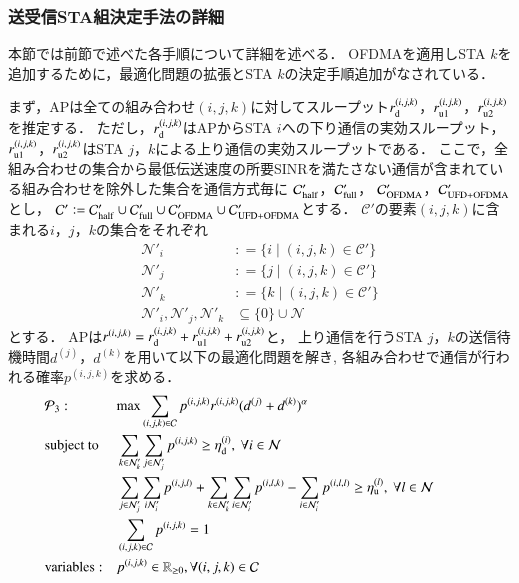 \documentclass[master]{kuisthesis}		%
\def\equiv{\mathrel{\mathop:}=}
\newcommand{\sijk}{(i,j,k)}
\newcommand{\rijk}{r^{(i,j,k)}}
\newcommand{\mthcd}{{\mathcal C}'}
\newcommand{\mthni}{{\mathcal N}'_i}
\newcommand{\mthnj}{{\mathcal N}'_j}
\newcommand{\mthnk}{{\mathcal N}'_k}
\begin{document}
		\subsubsection{送受信STA組決定手法の詳細}
			本節では前節で述べた各手順について詳細を述べる．
			OFDMAを適用しSTA $k$を追加するために，最適化問題の拡張とSTA $k$の決定手順追加がなされている．
			\par
			まず，APは全ての組み合わせ$(i,j,k)$に対してスループット$r^{(i,j,k)}_{\rm d}$，$r^{(i,j,k)}_{\rm u1}$，$r^{(i,j,k)}_{\rm u2}$を推定する．
			ただし，$r^{(i,j,k)}_{\rm d}$はAPからSTA $i$への下り通信の実効スループット，$r^{(i,j,k)}_{\rm u1}$，$r^{(i,j,k)}_{\rm u2}$はSTA $j$，$k$による上り通信の実効スループットである．
			ここで，全組み合わせの集合から最低伝送速度の所要SINRを満たさない通信が含まれている組み合わせを除外した集合を通信方式毎に
			${\mathcal C}'_{\rm half}$，${\mathcal C}'_{\rm full}$，
			${\mathcal C}'_{\rm OFDMA}$，${\mathcal C}'_{\rm UFD+OFDMA}$とし，
			${\mathcal C}'\equiv{\mathcal C}'_{\rm half}\cup{\mathcal C}'_{\rm full}\cup{\mathcal C}'_{\rm OFDMA}\cup{\mathcal C}'_{\rm UFD+OFDMA}$とする．
			$\mthcd$の要素$\sijk$に含まれる$i$，$j$，$k$の集合をそれぞれ
			\begin{align}
				\mthni &\equiv\{i\mid\sijk\in\mthcd\}\\
				\mthnj &\equiv\{j\mid\sijk\in\mthcd\}\\
				\mthnk &\equiv\{k\mid\sijk\in\mthcd\}\\
				\mthni,\mthnj,\mthnk&\subseteq \{0\}\cup{\mathcal N}
			\end{align}
			とする．
			APは$\rijk=r^{(i,j,k)}_{\rm d}+r^{(i,j,k)}_{\rm u1}+r^{(i,j,k)}_{\rm u2}$と，
			上り通信を行うSTA $j$，$k$の送信待機時間$d^{(j)}$，$d^{(k)}$を用いて以下の最適化問題を解き,
			各組み合わせで通信が行われる確率$p^{(i,j,k)}$を求める．
			\begin{align}
				&{\mathcal P}_3: && {\rm max} \sum_{(i,j,k)\in{\mathcal C}} p^{(i,j,k)}r^{(i,j,k)}(d^{(j)}+d^{(k)})^{\alpha} &&&&&&\\
				&{\rm subject\ to} && \sum_{k\in\mthnk} \sum_{j\in\mthnj} p^{(i,j,k)} \geq \eta_{\rm d}^{(i)},\ \forall i\in {\mathcal N} \label{eq:etad} \\
				&&& \sum_{j\in\mthnj} \sum_{i\mthni} p^{(i,j,l)}+\sum_{k\in\mthnk} \sum_{i\in\mthni} p^{(i,l,k)}- \sum_{i\in\mthni} p^{(i,l,l)} \geq \eta_{\rm u}^{(l)},\ \forall l\in {\mathcal N} \label{eq:etau} \\
				&&& \sum_{(i,j,k)\in{\mathcal C}} p^{(i,j,k)}=1 \\
				&{\rm variables:} &&p^{(i,j,k)} \in {\mathbb R}_{\geq 0},\forall(i,j,k)\in {\mathcal C}
			\end{align}
\end{document}

